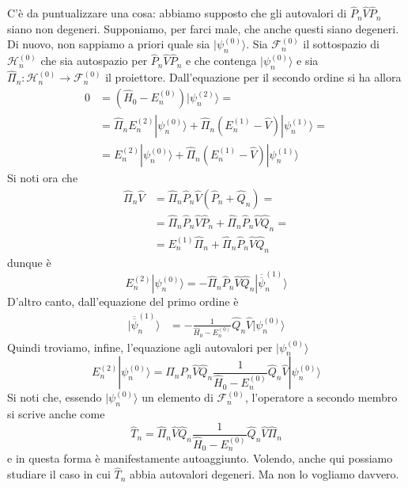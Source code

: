 \documentclass[a4paper, 11pt]{article}
\newcommand{\op}[1]{\hat{#1}}
\renewcommand{\H}{\mathcal{H}}
\renewcommand{\op}[1]{\hat{#1}}
\newcommand{\ham}{\hat{H}}
\renewcommand{\ket}[1]{| #1\rangle}
\begin{document}
 C'è da puntualizzare una cosa: abbiamo supposto che gli autovalori di $\op P_n\op V\op P_n$ siano non degeneri. Supponiamo, per farci male, che anche questi siano degeneri. Di nuovo, non sappiamo a priori quale sia $\ket{\psi_n^{(0)}}$. Sia $\mathcal{F}_n^{(0)}$ il sottospazio di $\H_n^{(0)}$ che sia autospazio per $\op P_n\op V\op P_n$ e che contenga $\ket{\psi_n^{(0)}}$ e sia $\op\Pi_n\colon\H_n^{(0)}\to\mathcal{F}_n^{(0)}$ il proiettore. Dall'equazione per il secondo ordine si ha allora
 \begin{align*}
 	0&=(\ham_0-E_n^{(0)})\ket{\psi_n^{(2)}}=\\&=\op \Pi_nE_n^{(2)}\ket{\psi_n^{(0)}}+\op{\Pi}_n(E_n^{(1)}-\op V)\ket{\psi_n^{(1)}}=\\&=E_n^{(2)}\ket{\psi_n^{(0)}}+\op{\Pi}_n(E_n^{(1)}-\op V)\ket{\psi_n^{(1)}}
 \end{align*}
 Si noti ora che
 \begin{align*}
 	\op \Pi_n\op V&=\op \Pi_n\op P_n\op V(\op P_n+\op Q_n)=\\&=\op \Pi_n\op P_n\op V\op P_n+\op \Pi_n\op P_n\op V\op Q_n=\\&=E_n^{(1)}\op{\Pi}_n+\op \Pi_n\op P_n\op V\op Q_n
 \end{align*}
 dunque è
 \[E_n^{(2)}\ket{\psi_n^{(0)}}=-\op \Pi_n\op P_n\op V\op Q_n\ket{\overline{\overline{\psi}}_n^{(1)}}\]
 D'altro canto, dall'equazione del primo ordine è
 \begin{align*}\ket{\overline{\overline{\psi}}_n^{(1)}}&=-\frac{1}{\ham_0-E_n^{(0)}}\op Q_n\op V\ket{\psi_n^{(0)}}\end{align*} 
 Quindi troviamo, infine, l'equazione agli autovalori per $\ket{\psi_n^{(0)}}$
 \[E_n^{(2)}\ket{\psi_n^{(0)}}=\op \Pi_n\op P_n\op V\op Q_n\frac{1}{\ham_0-E_n^{(0)}}\op Q_n\op V\ket{\psi_n^{(0)}}\]
 Si noti che, essendo $\ket{\psi_n^{(0)}}$ un elemento di $\mathcal{F}_n^{(0)}$, l'operatore a secondo membro si scrive anche come
 \[\op T_n=\op \Pi _n\op V\op Q_n\frac{1}{\ham_0-E_n^{(0)}}\op Q_n\op V\op \Pi _n\]
 e in questa forma è manifestamente autoaggiunto. Volendo, anche qui possiamo studiare il caso in cui $\op T_n$ abbia autovalori degeneri. Ma non lo vogliamo davvero.
\end{document}
